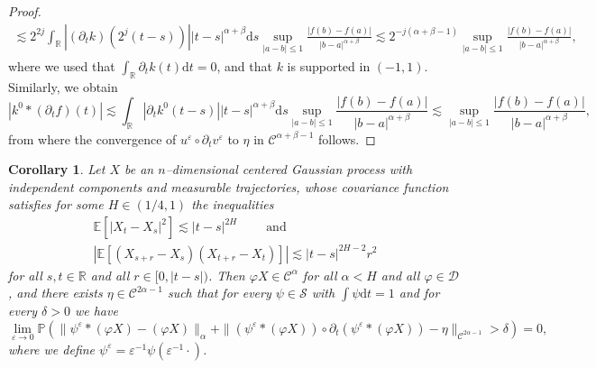 \documentclass[11pt,a4paper]{article}
\newcommand{\cdummy}{\cdot}
\newcommand{\mathd}{\mathrm{d}}
\newcommand{\tmop}[1]{\ensuremath{\operatorname{#1}}}
\newtheorem{corollary}[theorem]{Corollary}
\theoremstyle{remark}
\newcommand{\CC}{\ensuremath{\mathscr{C}}}
\newcommand{\CD}{\ensuremath{\mathscr{D}}}
\newcommand{\CS}{\ensuremath{\mathscr{S}}}
\begin{document}
\begin{proof}
\begin{gather*}
     \lesssim 2^{2j} \int_{\mathbb{R}} | ( \partial_{t} k ) ( 2^{j} ( t-s ) ) |   | t-s |^{\alpha + \beta} \mathd s \sup_{| a-b | \leqslant 1} \frac{| f( b ) -f ( a ) |}{| b-a |^{\alpha + \beta}} \lesssim 2^{-j ( \alpha + \beta -1 )} \sup_{| a-b | \leqslant 1} \frac{| f ( b ) -f ( a ) |}{| b-a |^{\alpha + \beta}},
  \end{gather*}
  where we used that $\int_{\mathbb{R}} \partial_{t} k ( t ) \mathd t=0$,
  and that $k$ is supported in $( -1,1)$. Similarly, we obtain
  \[
     | k^{0} \ast ( \partial_{t} f ) ( t ) |  \lesssim \int_{\mathbb{R}} | \partial_{t} k^{0} ( t-s ) |   | t-s |^{\alpha + \beta} \mathd s \sup_{| a-b | \leqslant 1} \frac{| f ( b ) -f ( a ) |}{| b-a |^{\alpha + \beta}} \lesssim \sup_{| a-b | \leqslant 1} \frac{| f ( b ) -f ( a ) |}{| b-a |^{\alpha + \beta}},
  \]
  from where the convergence of $u^{\varepsilon} \circ \partial_{t} v^{\varepsilon}$ to $\eta$ in $\CC^{\alpha + \beta -1}$ follows.
\end{proof}

\begin{corollary}\label{corollary:existence of rough path area}
  Let $X$ be an $n$--dimensional centered Gaussian process with independent components and measurable trajectories, whose covariance function satisfies for some $H \in ( 1/4,1 )$ the inequalities
  \begin{gather}\label{eq:classical rough path covariance} \nonumber
     \mathbb{E} [ | X_{t} -X_{s} |^{2} ] \lesssim | t-s |^{2H} \hspace{2em} \tmop{and} \\
     | \mathbb{E} [ ( X_{s+r} -X_{s} ) ( X_{t+r} -X_{t} ) ] | \lesssim | t-s |^{2H-2}  r^{2}
  \end{gather}
  for all $s,t \in \mathbb{R}$ and all $r \in [ 0, | t-s | )$. Then $\varphi X \in \CC^{\alpha}$ for all $\alpha <H$ and all $\varphi \in \CD$, and there
  exists $\eta \in \CC^{2 \alpha -1}$ such that for every $\psi \in \CS$ with
  $\int \psi \mathd t=1$ and for every $\delta >0$ we have
  \[
     \lim_{\varepsilon \rightarrow 0} \mathbb{P} \left( \| \psi^{\varepsilon}  \ast ( \varphi X ) - ( \varphi X ) \|_{\alpha} + \| ( \psi^{\varepsilon}  \ast ( \varphi X ) ) \circ \partial_{t} ( \psi^{\varepsilon} \ast (\varphi X ) ) - \eta \|_{\CC^{2 \alpha -1}} > \delta \right) =0,
  \]
  where we define $\psi^{\varepsilon} = \varepsilon^{-1} \psi (\varepsilon^{-1} \cdummy )$.
\end{corollary}
\end{document}
